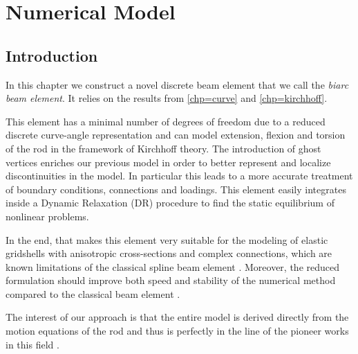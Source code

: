
\newrefsegment
\chapter{Numerical Model}\label{chp=numerical_model}

\section{Introduction}
In this chapter we construct a novel discrete beam element that we call the \emph{biarc beam element}. It relies on the results from \cref{chp=curve} and \cref{chp=kirchhoff}.

This element has a minimal number of degrees of freedom due to a reduced discrete curve-angle representation and can model extension, flexion and torsion of the rod in the framework of Kirchhoff theory. The introduction of ghost vertices enriches our previous model \cite{DuPeloux2015,Lefevre2017} in order to better represent and localize discontinuities in the model. In particular this leads to a more accurate treatment of boundary conditions, connections and loadings. This element easily integrates inside a Dynamic Relaxation (DR) procedure to find the static equilibrium of nonlinear problems.

In the end, that makes this element very suitable for the modeling of elastic gridshells with anisotropic cross-sections and complex connections, which are known limitations of the classical  spline beam element \cite{Adriaenssens2001,Douthe2006}. Moreover, the reduced formulation should improve both speed and stability of the numerical method compared to the classical  beam element \cite{Adriaenssens2000,DAmico2014}.

The interest of our approach is that the entire model is derived directly from the motion equations of the rod and thus is perfectly in the line of the pioneer works in this field \cite{Day1965}.

